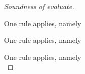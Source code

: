 \begin{proof}[Soundness of evaluate]
{    }

    {One rule applies, namely \\

    }

    {  One rule applies, namely \\

    }

    {  One rule applies, namely \\

    }

\end{proof}
